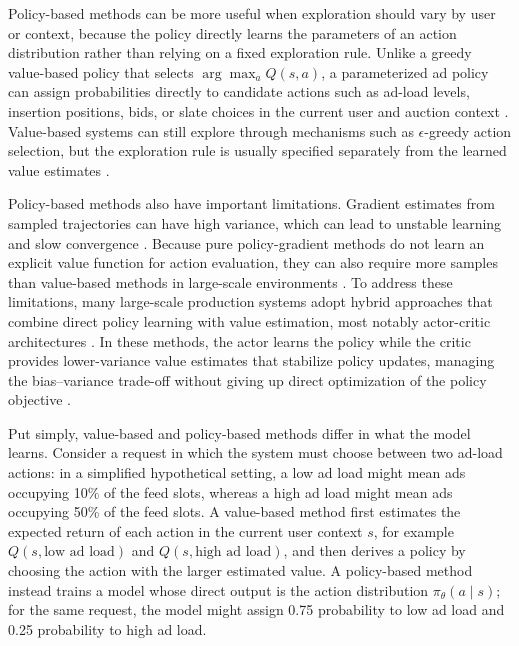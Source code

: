 \documentclass[manuscript,review,screen]{acmart}
\begin{document}
Policy-based methods can be more useful when exploration should vary by user or context, because the policy directly learns the parameters of an action distribution rather than relying on a fixed exploration rule. Unlike a greedy value-based policy that selects \(\arg\max_a Q(s, a)\), a parameterized ad policy can assign probabilities directly to candidate actions such as ad-load levels, insertion positions, bids, or slate choices in the current user and auction context \cite{zhao2021dear, xu2023optimizing}. Value-based systems can still explore through mechanisms such as \(\epsilon\)-greedy action selection, but the exploration rule is usually specified separately from the learned value estimates \cite{kaelbling1996reinforcement, dulac2021challenges}.

Policy-based methods also have important limitations. Gradient estimates from sampled trajectories can have high variance, which can lead to unstable learning and slow convergence \cite{williams1992simple, schulman2015trust}. Because pure policy-gradient methods do not learn an explicit value function for action evaluation, they can also require more samples than value-based methods in large-scale environments \cite{dulac2021challenges}. To address these limitations, many large-scale production systems adopt hybrid approaches that combine direct policy learning with value estimation, most notably actor-critic architectures \cite{chen2022off, gauci2018horizon}. In these methods, the actor learns the policy while the critic provides lower-variance value estimates that stabilize policy updates, managing the bias--variance trade-off without giving up direct optimization of the policy objective \cite{mnih2016asynchronous, chen2022off}.

Put simply, value-based and policy-based methods differ in what the model learns. Consider a request in which the system must choose between two ad-load actions: in a simplified hypothetical setting, a low ad load might mean ads occupying 10\% of the feed slots, whereas a high ad load might mean ads occupying 50\% of the feed slots. A value-based method first estimates the expected return of each action in the current user context \( s \), for example \( Q(s,\text{low ad load}) \) and \( Q(s,\text{high ad load}) \), and then derives a policy by choosing the action with the larger estimated value. A policy-based method instead trains a model whose direct output is the action distribution \( \pi_\theta(a \mid s) \); for the same request, the model might assign 0.75 probability to low ad load and 0.25 probability to high ad load.
\end{document}
